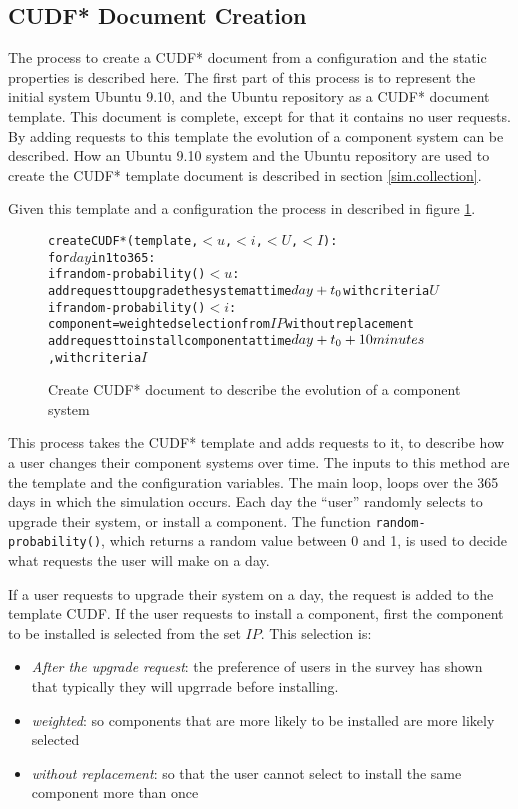 \subsection{CUDF* Document Creation}
The process to create a CUDF* document from a configuration and the static properties is described here.
The first part of this process is to represent the initial system Ubuntu 9.10, and the Ubuntu repository as a CUDF* document template.
This document is complete, except for that it contains no user requests.
By adding requests to this template the evolution of a component system can be described.
How an Ubuntu 9.10 system and the Ubuntu repository are used to create the CUDF* template document is described in section \ref{sim.collection}.

Given this template and a configuration the process in described in figure \ref{sim.CUDF*}.
\begin{figure}[h]
\begin{center}
\begin{alltt}
createCUDF*(template, \(< u\), \(< i\), \(< U\), \(< I\)):
  for \(day\) in 1 to 365:
    if random-probability() \(< u\):
      add request to upgrade the system at time \(day + t\sb{0}\) with criteria \(U\)
    if random-probability() \(< i\):  
      component = weighted selection from \(IP\) without replacement 
      add request to install component at time \(day + t\sb{0} + 10 minutes\), with criteria \(I\)
\end{alltt}
  \caption{Create CUDF* document to describe the evolution of a component system}
  \label{sim.CUDF*}
\end{center}
\end{figure}

This process takes the CUDF* template and adds requests to it, to describe how a user changes their component systems over time.
The inputs to this method are the template and the configuration variables.
The main loop, loops over the 365 days in which the simulation occurs.
Each day the ``user'' randomly selects to upgrade their system, or install a component.
The function \texttt{random-probability()}, which returns a random value between 0 and 1, is used to decide what requests the user will make on a day.

If a user requests to upgrade their system on a day, the request is added to the template CUDF.
If the user requests to install a component, first the component to be installed is selected from the set $IP$.
This selection is: 
\begin{itemize}
  \item \textit{After the upgrade request}: the preference of users in the survey has shown that typically they will upgrrade before installing.  
  \item \textit{weighted}: so components that are more likely to be installed are more likely selected
  \item \textit{without replacement}: so that the user cannot select to install the same component more than once
\end{itemize} 


